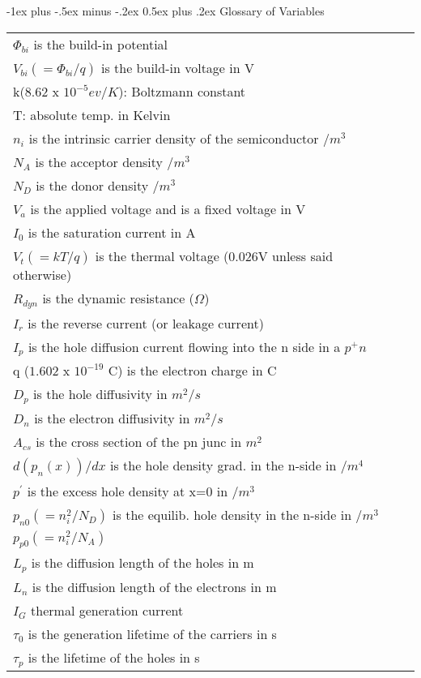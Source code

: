 \documentclass[10pt,landscape]{article}
\makeatletter
\renewcommand{\section}{\@startsection{section}{1}{0mm}%
                                {-1ex plus -.5ex minus -.2ex}%
                                {0.5ex plus .2ex}%
                                {\normalfont\large\bfseries}}
\makeatother
\begin{document}
\begin{multicols}{3}
\section{Glossary of Variables}
\begin{tabular}{@{}ll@{}}
$\Phi_{bi}$ is the build-in potential\\
$V_{bi} (=\Phi_{bi}/q)$ is the build-in voltage in V \\
k($ 8.62$ x $10^{-5}ev/K$): Boltzmann constant \\
T: absolute temp. in Kelvin \\
$ n_i$ is the intrinsic carrier density of the semiconductor $/m^3$ \\
$ N_A$ is the acceptor density $/m^3$ \\
$ N_D$ is the donor density $/m^3$ \\
$ V_a$ is the applied voltage and is a fixed voltage in V \\
$ I_0$ is the saturation current in A \\
$ V_t (=kT/q)$ is the thermal voltage (0.026V unless said otherwise)\\
$ R_{dyn}$ is the dynamic resistance ($\Omega$) \\
$ I_r$ is the reverse current (or leakage current) \\
$ I_p$ is the hole diffusion current flowing into the n side in a $p^+n$ \\
q ($1.602$ x $10^{-19}$ C) is the electron charge in C \\
$ D_p$ is the hole diffusivity in $m^2/s$ \\
$ D_n$ is the electron diffusivity in $m^2/s$ \\
$ A_{cs}$ is the cross section of the pn junc in $m^2$ \\
$ d(p_n(x))/dx$ is the hole density grad. in the n-side in $/m^4$\\
$ p^{\prime}$ is the excess hole density at x=0 in $/m^3$ \\
$ p_{n0} (=n^2_i/N_D)$ is the equilib. hole density in the n-side in $/m^3$ \\
$ p_{p0} (=n^2_i/N_A)$ \\
$ L_p$ is the diffusion length of the holes in m \\
$ L_n$ is the diffusion length of the electrons in m \\
$ I_G$ thermal generation current \\
$ \tau_0$ is the generation lifetime of the carriers in s\\
$ \tau_p$ is the lifetime of the holes in s\\

\end{tabular}
\end{multicols}
\end{document}
